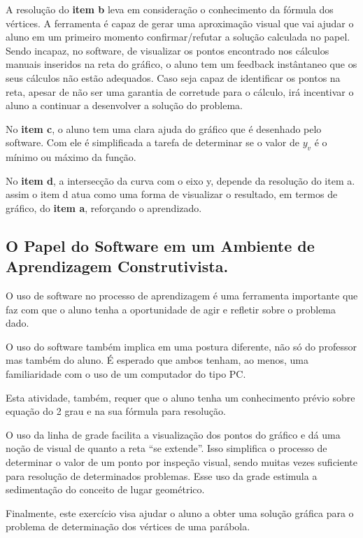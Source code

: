 \documentclass[a4paper,12pt]{article}
\begin{document}
A resolução do \textbf{item b} leva em consideração o conhecimento da fórmula dos vértices. A ferramenta é capaz de gerar uma aproximação visual que vai ajudar o aluno em um primeiro momento confirmar/refutar a solução calculada no papel. Sendo incapaz, no software, de visualizar os pontos encontrado nos cálculos manuais inseridos na reta do gráfico, o aluno tem um feedback instântaneo que os seus cálculos não estão adequados. Caso seja capaz de identificar os pontos na reta, apesar de não ser uma garantia de corretude para o cálculo, irá incentivar o aluno a continuar a desenvolver a solução do problema.

No \textbf{item c}, o aluno tem uma clara ajuda do gráfico que é desenhado pelo software. Com ele é simplificada a tarefa de determinar se o valor de ${y_v}$ é o mínimo ou máximo da função.

No \textbf{item d}, a intersecção da curva com o eixo y, depende da resolução do item a. assim o item d atua como uma forma de visualizar o resultado, em termos de gráfico, do \textbf{item a}, reforçando o aprendizado.

\subsection{O Papel do Software em um Ambiente de Aprendizagem Construtivista.}

O uso de software no processo de aprendizagem é uma ferramenta importante que faz com que o aluno tenha a oportunidade de agir e refletir sobre o problema dado.

O uso do software também implica em uma postura diferente, não só do professor mas também do aluno. É esperado que ambos tenham, ao menos, uma familiaridade com o uso de um computador do tipo PC.

Esta atividade, também, requer que o aluno tenha um conhecimento prévio sobre equação do 2 grau e na sua fórmula para resolução.

O uso da linha de grade facilita a visualização dos pontos do gráfico e dá uma noção de visual de quanto a reta “se extende”. Isso simplifica o processo de determinar o valor de um ponto por inspeção visual, sendo muitas vezes suficiente para resolução de determinados problemas. Esse uso da grade estimula a sedimentação do conceito de lugar geométrico.

Finalmente, este exercício visa ajudar o aluno a obter uma solução gráfica para o problema de determinação dos vértices de uma parábola.
\end{document}
